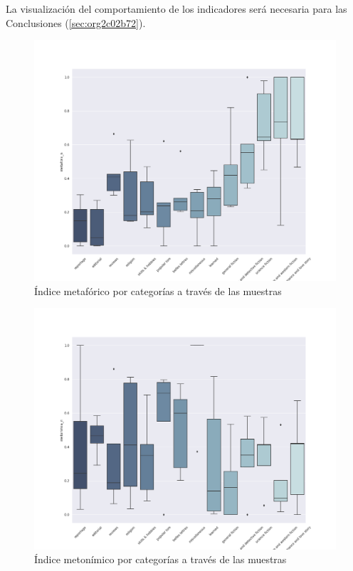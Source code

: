 \documentclass[12pt,letterpaper,twoside]{article}
\begin{document}
La visualización del comportamiento de los indicadores será necesaria para las Conclusiones (\ref{sec:org2c02b72}).

\begin{figure}[H]
\centering
\includegraphics[width=0.9\linewidth]{./resultados/graphs/total/accum_cat_metafora.png}
\caption{\label{fig:metafora_categorias} Índice metafórico por categorías a través de las muestras }
\end{figure}
\begin{figure}[H]
\centering
\includegraphics[width=0.9\linewidth]{./resultados/graphs/total/accum_cat_metonimia.png}
\caption{\label{fig:metonimia_categorias} Índice metonímico por categorías a través de las muestras  }
\end{figure}
\end{document}
